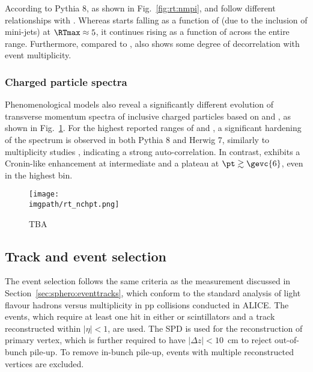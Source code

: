 According to Pythia 8, as shown in Fig.~\ref{fig:rt:nmpi}, \RTmin and \RTmax follow different relationships with \meannmpi. Whereas \meannmpi starts falling as a function of \RTmax (due to the inclusion of mini-jets) at $\RTmax \approx 5$, it continues rising as a function of \RTmin across the entire range. Furthermore, compared to \RT, \RTmin also shows some degree of decorrelation with event multiplicity.


\subsubsection{Charged particle \pt spectra}

Phenomenological models also reveal a significantly different evolution of transverse momentum spectra of inclusive charged particles based on \RTmin and \RTmax, as shown in Fig.~\ref{fig:rt:nchpt}. For the highest reported ranges of \RTmax and \RT, a significant hardening of the spectrum is observed in both Pythia 8 and Herwig 7, similarly to multiplicity studies \cite{alice-lfsmallsystems}, indicating a strong auto-correlation. In contrast, \RTmin exhibits a Cronin-like enhancement at intermediate \pt and a plateau at $\pt \gtrsim \gevc{6}$, even in the highest \RTmin bin. 

\begin{figure}%
\texttt{[image: \\imgpath/rt\_nchpt.png]}
\caption{TBA}
\label{fig:rt:nchpt}
\end{figure}

\subsection{Track and event selection}


The event selection follows the same criteria as the \SOPT measurement discussed in Section~\ref{sec:sphero:eventtracks}, which conform to the standard analysis of light flavour hadrons versus multiplicity in pp collisions conducted in ALICE. The \INELgtO events, which require at least one hit in either \VOA or \VOC scintillators and a track reconstructed within $|\eta|<1$, are used. The SPD is used for the reconstruction of primary vertex, which is further required to have $|\Delta z|<10$~cm to reject out-of-bunch pile-up. To remove in-bunch pile-up, events with multiple reconstructed vertices are excluded.

